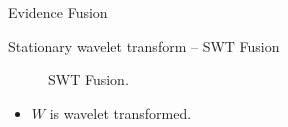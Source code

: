 \documentclass[10pt]{beamer}
\begin{document}
\begin{frame}[fragile]{Evidence Fusion}
\begin{alertblock}{Stationary wavelet transform -- SWT Fusion}
\begin{figure}[htb!]
\begin{tikzpicture}
\end{tikzpicture}
	\caption{SWT Fusion.}
\label{fig7}
\end{figure}
\begin{itemize}
\vspace{-0.8cm}
\item $W$ is wavelet transformed.
\end{itemize}
\end{alertblock}
\end{frame}




\end{document}
